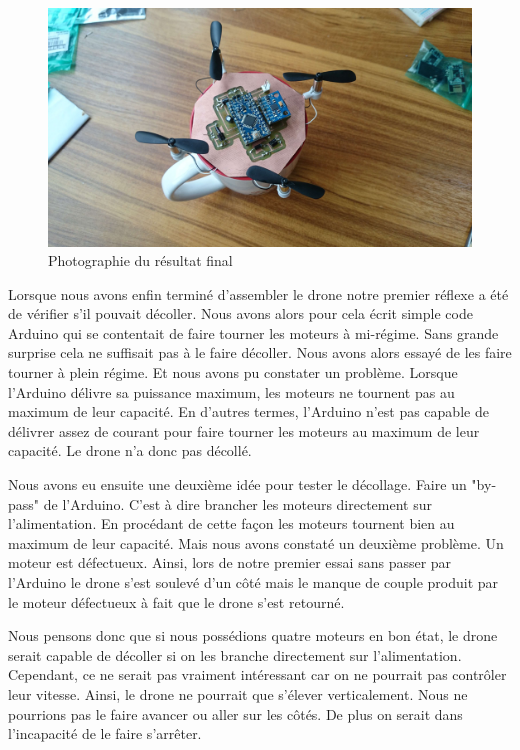 \documentclass[a4paper,10pt]{report}
\begin{document}
	  \begin{figure}[htbp]
	    \centering
	    \includegraphics[scale = 0.1]{img/drone_photo.jpg}
	    \caption{Photographie du résultat final}
	    \label{droneres}
	  \end{figure}
	
	  Lorsque nous avons enfin terminé d'assembler le drone notre premier 
réflexe a été de vérifier s'il pouvait décoller. Nous avons alors pour cela 
écrit simple code Arduino qui se contentait de faire tourner les moteurs à 
mi-régime. Sans grande surprise cela ne suffisait pas à le faire décoller. Nous 
avons alors essayé de les faire tourner à plein régime. Et nous avons pu 
constater un problème. Lorsque l'Arduino délivre sa puissance maximum, les 
moteurs ne tournent pas au maximum de leur capacité. En d'autres termes, 
l'Arduino n'est pas capable de délivrer assez de courant pour faire tourner les 
moteurs au maximum de leur capacité. Le drone n'a donc pas décollé.

	  Nous avons eu ensuite une deuxième idée pour tester le décollage. 
Faire un "by-pass" de l'Arduino. C'est à dire brancher les moteurs directement 
sur l'alimentation. En procédant de cette façon les moteurs tournent bien au 
maximum de leur capacité. Mais nous avons constaté un deuxième problème. Un 
moteur est défectueux. Ainsi, lors de notre premier essai sans passer par 
l'Arduino le drone s'est soulevé d'un côté mais le manque de couple produit par 
le moteur défectueux à fait que le drone s'est retourné.

	  Nous pensons donc que si nous possédions quatre moteurs en bon état, 
le drone serait capable de décoller si on les branche directement sur 
l'alimentation. Cependant, ce ne serait pas vraiment intéressant car on ne 
pourrait pas contrôler leur vitesse. Ainsi, le drone ne pourrait que s'élever 
verticalement. Nous ne pourrions pas le faire avancer ou aller sur les côtés. 
De plus on serait dans l'incapacité de le faire s'arrêter.
\end{document}
